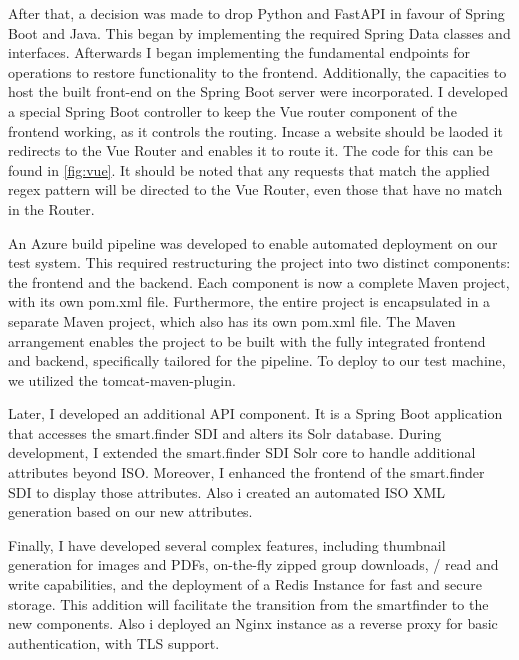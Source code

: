 \documentclass[11pt, titlepage, a4paper]{article}
\begin{document}
After that, a decision was made to drop Python and FastAPI in favour of Spring Boot and Java. This began by implementing the required Spring Data classes and interfaces. Afterwards I began implementing the fundamental endpoints for  operations to restore functionality to the frontend. Additionally, the capacities to host the built front-end on the Spring Boot server were incorporated. I developed a special Spring Boot controller to keep the Vue router component of the frontend working, as it controls the routing. Incase a website should be laoded it redirects to the Vue Router and enables it to route it. The code for this can be found in \ref{fig:vue}. It should be noted that any requests that match the applied regex pattern will be directed to the Vue Router, even those that have no match in the Router.

An Azure build pipeline was developed to enable automated deployment on our test system. This required restructuring the project into two distinct components: the frontend and the backend. Each component is now a complete Maven project, with its own pom.xml file. Furthermore, the entire project is encapsulated in a separate Maven project, which also has its own pom.xml file. The Maven arrangement enables the project to be built with the fully integrated frontend and backend, specifically tailored for the pipeline. To deploy to our test machine, we utilized the tomcat-maven-plugin.

Later, I developed an additional API component. It is a Spring Boot application that accesses the smart.finder SDI and alters its Solr database. During development, I extended the smart.finder SDI Solr core to handle additional attributes beyond ISO. Moreover, I enhanced the frontend of the smart.finder SDI to display those attributes.
Also i created an automated ISO XML generation based on our new attributes.

Finally, I have developed several complex features, including thumbnail generation for images and PDFs, on-the-fly zipped group downloads, / read and write capabilities, and the deployment of a Redis Instance for fast and secure storage. This addition will facilitate the transition from the smartfinder to the new components. Also i deployed an Nginx instance as a reverse proxy for basic authentication, with TLS support.
\end{document}
